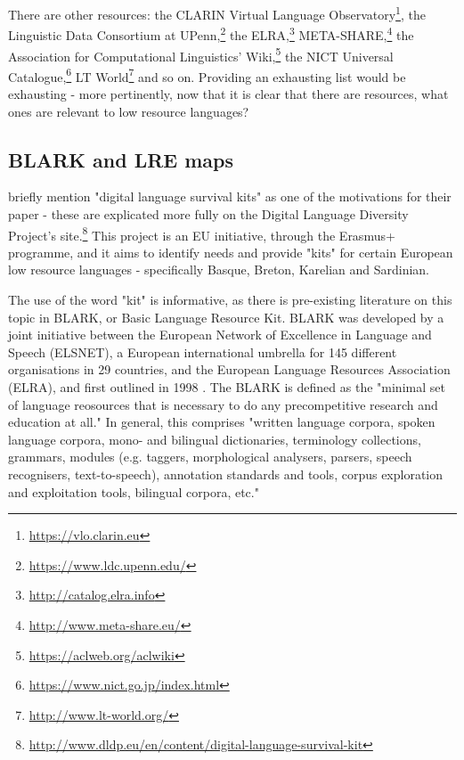 \begin{itemize}


\end{itemize}

There are other resources: the CLARIN Virtual Language Observatory\footnote{\href{https://vlo.clarin.eu}{https://vlo.clarin.eu}}, the Linguistic Data Consortium at UPenn,\footnote{\href{https://www.ldc.upenn.edu/}{https://www.ldc.upenn.edu/}} the ELRA,\footnote{\href{http://catalog.elra.info}{http://catalog.elra.info}} META-SHARE,\footnote{\href{http://www.meta-share.eu/}{http://www.meta-share.eu/}} the Association for Computational Linguistics' Wiki,\footnote{\href{https://aclweb.org/aclwiki}{https://aclweb.org/aclwiki}} the NICT Universal Catalogue,\footnote{\href{https://www.nict.go.jp/index.html}{https://www.nict.go.jp/index.html}} LT World\footnote{\href{http://www.lt-world.org/}{http://www.lt-world.org/}} and so on. Providing an exhausting list would be exhausting - more pertinently, now that it is clear that there are resources, what ones are relevant to low resource languages?

\subsection{BLARK and LRE maps}
\label{subsec:blark-and-lre-maps}

\citet{soria2017digital} briefly mention "digital language survival kits" as one of the motivations for their paper - these are explicated more fully on the Digital Language Diversity Project's site.\footnote{\href{http://www.dldp.eu/en/content/digital-language-survival-kit}{http://www.dldp.eu/en/content/digital-language-survival-kit}} This project is an EU initiative, through the Erasmus+ programme, and it aims to identify needs and provide "kits" for certain European low resource languages - specifically Basque, Breton, Karelian and Sardinian.

The use of the word "kit" is informative, as there is pre-existing literature on this topic in BLARK, or Basic Language Resource Kit. BLARK was developed by a joint initiative between the European Network of Excellence in Language and Speech (ELSNET), a European international umbrella for 145 different organisations in 29 countries, and the European Language Resources Association (ELRA), and first outlined in 1998 \citep{krauwer1998elsnet}. The BLARK is defined as the "minimal set of language reosources that is necessary to do any precompetitive research and education at all." \citep[4]{krauwer2003basic} In general, this comprises "written language corpora, spoken language corpora, mono- and bilingual dictionaries, terminology collections, grammars, modules (e.g. taggers, morphological analysers, parsers, speech recognisers, text-to-speech), annotation standards and tools, corpus exploration and exploitation tools, bilingual corpora, etc."

